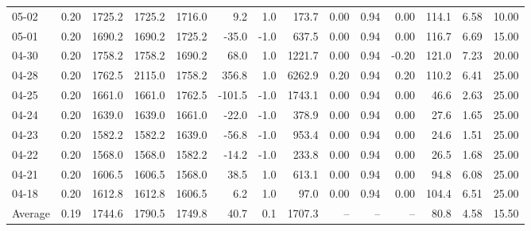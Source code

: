 \begin{threeparttable}
{\begin{tabular}{lrrrrrrrrrrrrr}
  05-02 &     0.20 & 1725.2 & 1725.2 & 1716.0 &        9.2 &                      1.0 &               173.7 &       0.00 &      0.94 &           0.00 &            114.1 &            6.58 &                  10.00 \\
  05-01 &     0.20 & 1690.2 & 1690.2 & 1725.2 &      -35.0 &                     -1.0 &               637.5 &       0.00 &      0.94 &           0.00 &            116.7 &            6.69 &                  15.00 \\
  04-30 &     0.20 & 1758.2 & 1758.2 & 1690.2 &       68.0 &                      1.0 &              1221.7 &       0.00 &      0.94 &          -0.20 &            121.0 &            7.23 &                  20.00 \\
  04-28 &     0.20 & 1762.5 & 2115.0 & 1758.2 &      356.8 &                      1.0 &              6262.9 &       0.20 &      0.94 &           0.20 &            110.2 &            6.41 &                  25.00 \\
  04-25 &     0.20 & 1661.0 & 1661.0 & 1762.5 &     -101.5 &                     -1.0 &              1743.1 &       0.00 &      0.94 &           0.00 &             46.6 &            2.63 &                  25.00 \\
  04-24 &     0.20 & 1639.0 & 1639.0 & 1661.0 &      -22.0 &                     -1.0 &               378.9 &       0.00 &      0.94 &           0.00 &             27.6 &            1.65 &                  25.00 \\
  04-23 &     0.20 & 1582.2 & 1582.2 & 1639.0 &      -56.8 &                     -1.0 &               953.4 &       0.00 &      0.94 &           0.00 &             24.6 &            1.51 &                  25.00 \\
  04-22 &     0.20 & 1568.0 & 1568.0 & 1582.2 &      -14.2 &                     -1.0 &               233.8 &       0.00 &      0.94 &           0.00 &             26.5 &            1.68 &                  25.00 \\
  04-21 &     0.20 & 1606.5 & 1606.5 & 1568.0 &       38.5 &                      1.0 &               613.1 &       0.00 &      0.94 &           0.00 &             94.8 &            6.08 &                  25.00 \\
  04-18 &     0.20 & 1612.8 & 1612.8 & 1606.5 &        6.2 &                      1.0 &                97.0 &       0.00 &      0.94 &           0.00 &            104.4 &            6.51 &                  25.00 \\
Average &     0.19 & 1744.6 & 1790.5 & 1749.8 &       40.7 &                      0.1 &              1707.3 &         -- &        -- &             -- &             80.8 &            4.58 &                  15.50 \\

\end{tabular}}
\end{threeparttable}
